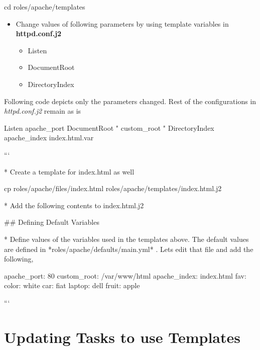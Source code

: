\begin{code}
    cd roles/apache/templates

\end{code}

\begin{itemize}
\item Change values of following  parameters by using template variables in \textbf{httpd.conf.j2}\newline


\begin{itemize}
\item Listen  
\item DocumentRoot  
\item DirectoryIndex
\end{itemize}
\end{itemize}

Following code depicts only the parameters changed. Rest of the configurations in \emph{httpd.conf.j2} remain as is

\begin{code}

    Listen {{ apache_port }}
    DocumentRoot "{{ custom_root }}"
    DirectoryIndex {{ apache_index }} index.html.var

```  

  * Create a template for index.html as well  

\end{code}
      cp roles/apache/files/index.html roles/apache/templates/index.html.j2
\begin{code}

  * Add the following contents to index.html.j2  
\end{code}

\begin{code}


## Defining Default Variables  

  * Define values of the variables used in the templates above.  The default values are defined in *roles/apache/defaults/main.yml* . Lets edit that file and add the following,   

\end{code}
  apache\_port: 80
  custom\_root: /var/www/html
  apache\_index: index.html
  fav:
    color: white
    car: fiat
    laptop: dell
    fruit: apple

```  

\section{Updating Tasks to use Templates}

